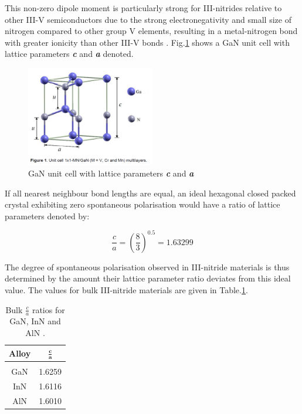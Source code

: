 This non-zero dipole moment is particularly strong for III-nitrides relative to other III-V semiconductors due to the strong electronegativity and small size of nitrogen compared to other group V elements, resulting in a metal-nitrogen bond with greater ionicity than other III-V bonds \cite{wood2007polarization}. Fig.\ref{1.4} shows a GaN unit cell with lattice parameters {\textbf {\it c}} and \textbf{\it a} denoted.

\begin{figure}[h]
	\centering
	\includegraphics[width=0.5\textwidth]{Figs/Ch1/2unit.png}
	\caption {GaN unit cell with lattice parameters \textbf{\it c} and \textbf{\it a} \cite{Miguel2014}}
	\label{1.4}
\end{figure}
\FloatBarrier 

If all nearest neighbour bond lengths are equal, an ideal hexagonal closed packed crystal exhibiting zero spontaneous polarisation would have a ratio of lattice parameters denoted by:

\begin{equation}
\frac{c}{a}= (\frac{8}{3})^{0.5} = 1.63299
\end{equation} 

The degree of spontaneous polarisation observed in III-nitride materials is thus determined by the amount their lattice parameter ratio deviates from this ideal value. The values for bulk III-nitride materials are given in Table.\ref{tab1.2}. 

\begin{table}[!htb]
	\centering
	\label{tab1.1}
	\begin{tabular}{cc}
		\textbf{Alloy} &  $\mathbf{\frac{c}{a}}$ \\
		\hline\hline\\
		GaN   & 1.6259      \\
		InN   & 1.6116     \\
		AlN   & 1.6010   \\ 
		\hline
	\end{tabular}
	\caption{Bulk $\frac{c}{a}$ ratios for GaN, InN and AlN \cite{Ren2015}.}
	\label{tab1.2}
\end{table}

